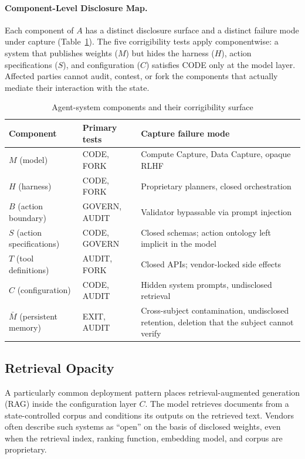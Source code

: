 \documentclass{article}
\theoremstyle{definition}
\begin{document}
\paragraph{Component-Level Disclosure Map.} Each component of $A$ has a distinct disclosure surface and a distinct failure mode under capture (Table~\ref{tab:agent-components}). The five corrigibility tests apply componentwise: a system that publishes weights ($M$) but hides the harness ($H$), action specifications ($S$), and configuration ($C$) satisfies CODE only at the model layer. Affected parties cannot audit, contest, or fork the components that actually mediate their interaction with the state.

\begin{table}[htbp]
\centering
\small
\caption{Agent-system components and their corrigibility surface}
\label{tab:agent-components}
\begin{tabular}{@{}llp{6.5cm}@{}}
\toprule
\textbf{Component} & \textbf{Primary tests} & \textbf{Capture failure mode} \\
\midrule
$M$ (model) & CODE, FORK & Compute Capture, Data Capture, opaque RLHF \\
$H$ (harness) & CODE, FORK & Proprietary planners, closed orchestration \\
$B$ (action boundary) & GOVERN, AUDIT & Validator bypassable via prompt injection \\
$S$ (action specifications) & CODE, GOVERN & Closed schemas; action ontology left implicit in the model \\
$T$ (tool definitions) & AUDIT, FORK & Closed APIs; vendor-locked side effects \\
$C$ (configuration) & CODE, AUDIT & Hidden system prompts, undisclosed retrieval \\
$\bar{M}$ (persistent memory) & EXIT, AUDIT & Cross-subject contamination, undisclosed retention, deletion that the subject cannot verify \\
\bottomrule
\end{tabular}
\end{table}

\subsection{Retrieval Opacity}
\label{subsec:retrieval-opacity}

A particularly common deployment pattern places retrieval-augmented generation (RAG) inside the configuration layer $C$. The model retrieves documents from a state-controlled corpus and conditions its outputs on the retrieved text. Vendors often describe such systems as ``open'' on the basis of disclosed weights, even when the retrieval index, ranking function, embedding model, and corpus are proprietary.
\end{document}
